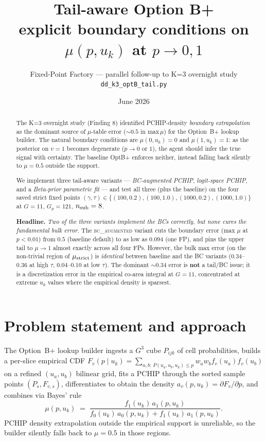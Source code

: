\documentclass[11pt]{article}
\title{Tail-aware Option B+\\
{\large explicit boundary conditions on $\mu(p,u_k)$ at $p\to 0,1$}}
\author{Fixed-Point Factory --- parallel follow-up to K=3 overnight study\\
        \texttt{dd\_k3\_optB\_tail.py}}
\date{June 2026}
\begin{document}
\maketitle

\begin{abstract}
\noindent
The K=3 overnight study (Finding 8) identified PCHIP-density
\emph{boundary extrapolation} as the dominant source of $\mu$-table error
(${\sim}0.5$ in max\,$\mu$) for the Option~B+ lookup builder. The natural
boundary conditions are $\mu(0,u_k)=0$ and $\mu(1,u_k)=1$: as the posterior on
$v=1$ becomes degenerate ($p\to 0$ or $1$), the agent should infer the true
signal with certainty. The baseline OptB+ enforces neither, instead falling
back silently to $\mu=0.5$ outside the support.

We implement three tail-aware variants --- \emph{BC-augmented PCHIP},
\emph{logit-space PCHIP}, and a \emph{Beta-prior parametric fit} --- and test
all three (plus the baseline) on the four saved strict fixed points
$(\gamma,\tau)\in\{(100,0.2),(100,1.0),(1000,0.2),(1000,1.0)\}$ at $G=11$,
$G_p=121$, $n_{\rm sub}=8$.

\textbf{Headline.} \emph{Two of the three variants implement the BCs
correctly, but none cures the fundamental bulk error.} The
\textsc{bc\_augmented} variant cuts the boundary error (max $\mu$ at $p<0.01$)
from $0.5$ (baseline default) to as low as $0.094$ (one FP), and pins the
upper tail to $\mu\!\to\!1$ almost exactly across all four FPs. However, the
bulk max error (on the non-trivial region of $\mu_{\rm strict}$) is
\emph{identical} between baseline and the BC variants ($0.34$--$0.36$ at high
$\tau$, $0.04$--$0.10$ at low $\tau$). The dominant ${\sim}0.34$ error is
\textbf{not} a tail/BC issue; it is a discretization error in the empirical
co-area integral at $G=11$, concentrated at extreme $u_k$ values where the
empirical density is sparsest.
\end{abstract}

\section{Problem statement and approach}

The Option~B+ lookup builder ingests a $G^3$ cube $P_{ijk}$ of cell
probabilities, builds a per-slice empirical CDF
$F_v(p\mid u_k) = \sum_{a,b:\, P(u_a,u_b,u_k)\le p}\!w_a w_b f_v(u_a)f_v(u_b)$
on a refined $(u_a,u_b)$ bilinear grid, fits a PCHIP through the sorted
sample points $(P_s, F_{v,s})$, differentiates to obtain the density
$a_v(p,u_k) = \partial F_v/\partial p$, and combines via Bayes' rule
\[
   \mu(p, u_k) \;=\; \frac{f_1(u_k)\, a_1(p,u_k)}{f_0(u_k)\,a_0(p,u_k) + f_1(u_k)\,a_1(p,u_k)}.
\]
PCHIP density extrapolation outside the empirical support is unreliable, so
the builder silently falls back to $\mu=0.5$ in those regions.
\end{document}
